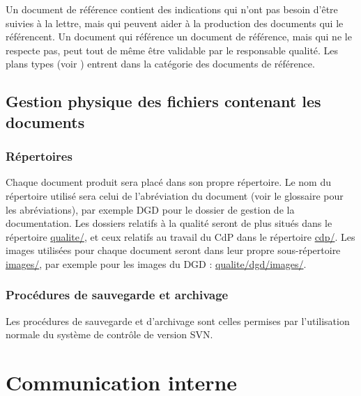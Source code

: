 Un document de référence contient des indications qui n'ont pas besoin d'être suivies à la lettre, mais qui peuvent aider à la production des documents qui le référencent. Un document qui référence un document de référence, mais qui ne le respecte pas, peut tout de même être validable par le responsable qualité. Les plans types (voir ) entrent dans la catégorie des documents de référence.

\section{Gestion physique des fichiers contenant les documents}

\subsection{Répertoires}

Chaque document produit sera placé dans son propre répertoire. Le nom du répertoire utilisé sera celui de l'abréviation du document (voir le glossaire pour les abréviations), par exemple DGD pour le dossier de gestion de la documentation. Les dossiers relatifs à la qualité seront de plus situés dans le répertoire \url{qualite/}, et ceux relatifs au travail du CdP dans le répertoire \url{cdp/}. Les images utilisées pour chaque document seront dans leur propre sous-répertoire \url{images/}, par exemple pour les images du DGD : \url{qualite/dgd/images/}.

\subsection{Procédures de sauvegarde et archivage}

Les procédures de sauvegarde et d'archivage sont celles permises par l'utilisation normale du système de contrôle de version SVN.

\chapter{Communication interne}


